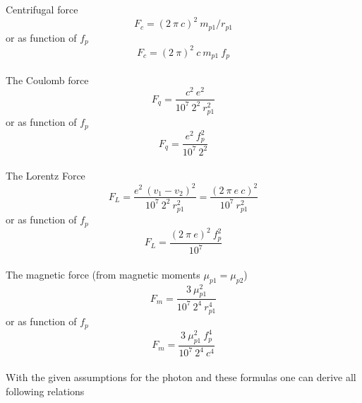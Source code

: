 \documentclass[10pt,titlepage]{article}
\begin{document}
 Centrifugal force
 \begin{equation}
 F_c=(2 \ \pi \ c)^2 \ m_{p1}/r_{p1}
 \end{equation}
or as function of $f_p$
\begin{equation}
 F_c=(2 \ \pi)^2 \ c \ m_{p1} \ f_p
 \end{equation}\\
 The Coulomb force
 \begin{equation}
 F_q=\frac{c^2 \ e^2}{10^7 \ 2^2 \ r_{p1}^2}
 \end{equation}
or as function of $f_p$
  \begin{equation}
 F_q=\frac{e^2 \ f_p^2}{10^7 \ 2^2}
 \end{equation}\\
The Lorentz Force
\begin{equation}
F_L=\frac{e^2 \ (v_1-v_2)^2}{10^7 \ 2^2 \ r_{p1}^2}=\frac{(2 \ \pi \ e \ c)^2}{10^7 \ r_{p1}^2}
\end{equation} 
or as function of $f_p$
\begin{equation}
F_L=\frac{(2 \ \pi \ e)^2 \ f_p^2}{10^7}
\end{equation} \\
The magnetic force (from magnetic moments $\mu_{p1}=\mu_{p2}$)
\begin{equation}
F_m=\frac{3 \ \mu_{p1}^2}{10^7 \ 2^4 \ r_{p1}^4}
\end{equation}
or as function of $f_p$
\begin{equation}
F_m=\frac{3 \ \mu_{p1}^2 \ f_p^4}{10^7 \ 2^4 \ c^4}
\end{equation}
\\

 With the given assumptions for the photon and these formulas one can derive all following relations
 
 
 
\end{document}
